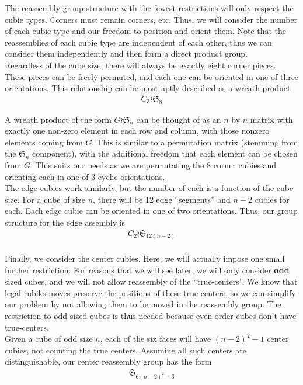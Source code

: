 \documentclass[10pt,letterpaper]{report}
\begin{document}
The reassembly group structure with the fewest restrictions will only respect the cubie types.  Corners must remain corners, etc.  Thus, we will consider the number of each cubie type and our freedom to position and orient them.  Note that the reassemblies of each cubie type are independent of each other, thus we can consider them independently and then form a direct product group. \\

Regardless of the cube size, there will always be exactly eight corner pieces.  These pieces can be freely permuted, and each one can be oriented in one of three orientations.  This relationship can be most aptly described as a wreath product \begin{align*}
C_3 \wr \mathfrak{S}_8
\end{align*}

A wreath product of the form $G \wr \mathfrak{S}_n$ can be thought of as an $n$ by $n$ matrix with exactly one non-zero element in each row and column, with those nonzero elements coming from $G$.  This is similar to a permutation matrix (stemming from the $\mathfrak{S}_n$ component), with the additional freedom that each element can be chosen from $G$.  This suits our needs as we are permutating the 8 corner cubies and orienting each in one of 3 cyclic orientations. \\

The edge cubies work similarly, but the number of each is a function of the cube size.  For a cube of size $n$, there will be 12 edge ``segments'' and $n-2$ cubies for each.  Each edge cubie can be oriented in one of two orientations.  Thus, our group structure for the edge assembly is \begin{align*}
C_2 \wr \mathfrak{S}_{12(n-2)}
\end{align*} \\

Finally, we consider the center cubies.  Here, we will actually impose one small further restriction.  For reasons that we will see later, we will only consider \textbf{odd} sized cubes, and we will not allow reassembly of the ``true-centers''.  We know that legal rubiks moves preserve the positions of these true-centers, so we can simplify our problem by not allowing them to be moved in the reassembly group.  The restriction to odd-sized cubes is thus needed because even-order cubes don't have true-centers. \\

Given a cube of odd size $n$, each of the six faces will have $(n-2)^2 -1$ center cubies, not counting the true centers.  Assuming all such centers are distinguishable, our center reassembly group has the form \begin{align*}
\mathfrak{S}_{6(n-2)^2 - 6}
\end{align*}
\end{document}
